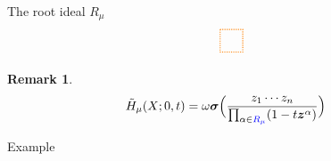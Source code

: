 \documentclass[dvipsnames]{beamer}
\newcommand{\zz}{{\boldsymbol z}}
\newcommand{\sigmabold}{\boldsymbol \sigma}
\newcommand{\Htild}{\tilde{H}}
\theoremstyle{definition}
\newtheorem{rmk}[thm]{Remark}
\newcommand{\colorb}[1]{\textcolor{blue}{#1}}
\newcounter{c}
\begin{document}
\begin{frame}{The root ideal \(R_\mu\)}
\begin{align*}
\begin{tikzpicture}[scale=.213]
\draw[thick, densely dotted, orange] (7,-7) rectangle (10,-10);
\end{tikzpicture}
\end{align*}
\vspace{-0.5cm}
\pause
\begin{rmk}
  \begin{align*}
    \Htild_\mu(X;0,t) 
    & =
      \omega \sigmabold
      \Big( \frac{z_1\cdots z_n}{\prod_{\alpha \in
      \colorb{R_\mu}}(1 - t \zz^\alpha)} 
      \Big)
  \end{align*}
\end{rmk}
\end{frame}

\begin{frame}{Example}
  \begin{overlayarea}{\textwidth}{\textheight}


\end{overlayarea}
\end{frame}
\end{document}
